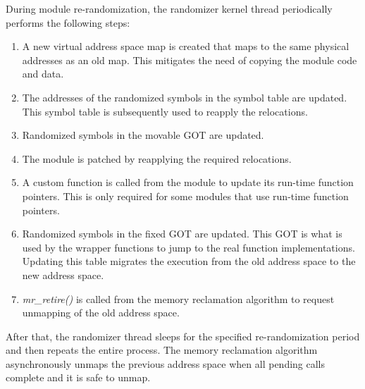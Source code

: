 During module re-randomization, the randomizer kernel thread periodically performs the following steps:
\begin{enumerate}
\item A new virtual address space map is created that maps to the same physical addresses as an old map. This mitigates the need of copying the module code and data.

\item The addresses of the randomized symbols in the symbol table are updated. This symbol table is subsequently used to reapply the relocations.

\item Randomized symbols in the movable GOT are updated.

\item The module is patched by reapplying the required relocations.

\item A custom function is called from the module to update its run-time function pointers. This is only required for some modules that use run-time function pointers.

\item Randomized symbols in the fixed GOT are updated. This GOT is what is used by the wrapper functions to jump to the real function implementations. Updating this table migrates the execution from the old address space to the new address space.

\item \textit{mr\_retire()} is called from the memory reclamation algorithm to request unmapping of the old address space.
\end{enumerate}
After that, the randomizer thread sleeps for the specified re-randomization period and then repeats the entire process.
The memory reclamation algorithm asynchronously unmaps the previous address space when all pending calls complete and it is safe to unmap.